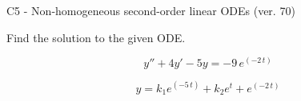\begin{exercise}
  \begin{exerciseTitle}C5 - Non-homogeneous second-order linear ODEs (ver. 70)\end{exerciseTitle}
  \begin{exerciseStatement}
    
Find the solution to the given ODE.

    
\[y''+4y'-5y = -9 \, e^{\left(-2 \, t\right)}\]

  \end{exerciseStatement}
  \begin{exerciseAnswer}
    
\[y= k_{1} e^{\left(-5 \, t\right)} + k_{2} e^{t} + e^{\left(-2 \, t\right)}\]

  \end{exerciseAnswer}
\end{exercise}